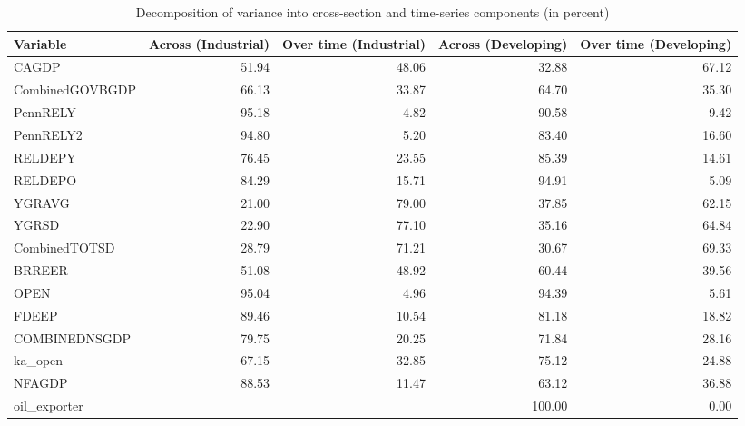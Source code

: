 \begin{table}[ht]
\centering
\begin{tabular}{lrrrr}
  \toprule
Variable & Across (Industrial) & Over time (Industrial) & Across (Developing) & Over time (Developing) \\ 
  \midrule
CAGDP & 51.94 & 48.06 & 32.88 & 67.12 \\ 
  CombinedGOVBGDP & 66.13 & 33.87 & 64.70 & 35.30 \\ 
  PennRELY & 95.18 & 4.82 & 90.58 & 9.42 \\ 
  PennRELY2 & 94.80 & 5.20 & 83.40 & 16.60 \\ 
  RELDEPY & 76.45 & 23.55 & 85.39 & 14.61 \\ 
  RELDEPO & 84.29 & 15.71 & 94.91 & 5.09 \\ 
  YGRAVG & 21.00 & 79.00 & 37.85 & 62.15 \\ 
  YGRSD & 22.90 & 77.10 & 35.16 & 64.84 \\ 
  CombinedTOTSD & 28.79 & 71.21 & 30.67 & 69.33 \\ 
  BRREER & 51.08 & 48.92 & 60.44 & 39.56 \\ 
  OPEN & 95.04 & 4.96 & 94.39 & 5.61 \\ 
  FDEEP & 89.46 & 10.54 & 81.18 & 18.82 \\ 
  COMBINEDNSGDP & 79.75 & 20.25 & 71.84 & 28.16 \\ 
  ka\_open & 67.15 & 32.85 & 75.12 & 24.88 \\ 
  NFAGDP & 88.53 & 11.47 & 63.12 & 36.88 \\ 
  oil\_exporter &  &  & 100.00 & 0.00 \\ 
   \bottomrule
\end{tabular}
\caption{Decomposition of variance into cross-section and time-series components (in percent)} 
\label{tab:table1}
\end{table}

